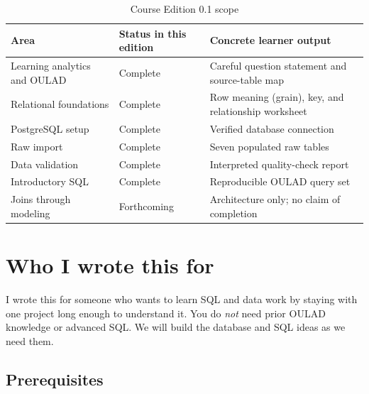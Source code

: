 \begin{table}[htbp]
\centering
\caption{Course Edition 0.1 scope}
\label{tab:edition-scope}
\begin{tabularx}{\textwidth}{L{0.27\textwidth}YY}
\toprule
Area & Status in this edition & Concrete learner output \\
\midrule
Learning analytics and OULAD & Complete & Careful question statement and source-table map \\
Relational foundations & Complete & Row meaning (grain), key, and relationship worksheet \\
PostgreSQL setup & Complete & Verified database connection \\
Raw import & Complete & Seven populated raw tables \\
Data validation & Complete & Interpreted quality-check report \\
Introductory SQL & Complete & Reproducible OULAD query set \\
Joins through modeling & Forthcoming & Architecture only; no claim of completion \\
\bottomrule
\end{tabularx}
\end{table}

\section{Who I wrote this for}

I wrote this for someone who wants to learn SQL and data work by staying with
one project long enough to understand it. You do \emph{not} need prior OULAD
knowledge or advanced SQL. We will build the database and SQL ideas as we need
them.

\subsection{Prerequisites}

